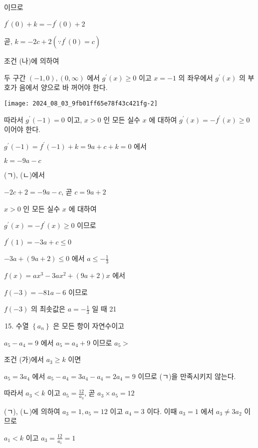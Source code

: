 \documentclass[10pt]{article}
\begin{document}
이므로

\(f^{\prime}(0)+k=-f^{\prime}(0)+2\)

곧, \(k=-2 c+2\left(\because f^{\prime}(0)=c\right)\)

조건 (나)에 의하여

두 구간 \((-1,0),(0, \infty)\) 에서 \(g^{\prime}(x) \geq 0\) 이고 \(x=-1\) 의 좌우에서 \(g^{\prime}(x)\) 의 부호가 음에서 양으로 바 꺼어야 한다.

\begin{center}
\texttt{[image: 2024\_08\_03\_9fb01ff65e78f43c421fg-2]}
\end{center}

따라서 \(g^{\prime}(-1)=0\) 이고, \(x>0\) 인 모든 실수 \(x\) 에 대하여 \(g^{\prime}(x)=-f^{\prime}(x) \geq 0\) 이어야 한다.

\(g^{\prime}(-1)=f^{\prime}(-1)+k=9 a+c+k=0\) 에서

\(k=-9 a-c\)

(ㄱ), (ㄴ)에서

\(-2 c+2=-9 a-c\), 곧 \(c=9 a+2\)

\(x>0\) 인 모든 실수 \(x\) 에 대하여

\(g^{\prime}(x)=-f^{\prime}(x) \geq 0\) 이므로

\(f^{\prime}(1)=-3 a+c \leq 0\)

\(-3 a+(9 a+2) \leq 0\) 에서 \(a \leq-\frac{1}{3}\)

\(f(x)=a x^{3}-3 a x^{2}+(9 a+2) x\) 에서

\(f(-3)=-81 a-6\) 이므로

\(f(-3)\) 의 최솟값은 \(a=-\frac{1}{3}\) 일 때 21

\begin{enumerate}
  \setcounter{enumi}{14}
  \item 수열 \(\left\{a_{n}\right\}\) 은 모든 항이 자연수이고
\end{enumerate}

\(a_{5}-a_{4}=9\) 에서 \(a_{5}=a_{4}+9\) 이므로 \(a_{5}>\)

조건 (가)에서 \(a_{3} \geq k\) 이면

\(a_{5}=3 a_{4}\) 에서 \(a_{5}-a_{4}=3 a_{4}-a_{4}=2 a_{4}=9\) 이므로 (ㄱ)을 만족시키지 않는다.

따라서 \(a_{3}<k\) 이고 \(a_{5}=\frac{12}{a_{3}}\), 곧 \(a_{3} \times a_{5}=12\)

(ㄱ), (ㄴ)에 의하여 \(a_{3}=1, a_{5}=12\) 이고 \(a_{4}=3\) 이다. 이때 \(a_{3}=1\) 에서 \(a_{3} \neq 3 a_{2}\) 이므로

\(a_{1}<k\) 이고 \(a_{3}=\frac{12}{a_{1}}=1\)
\end{document}
